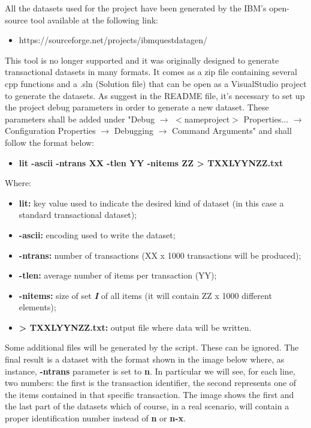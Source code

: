 \documentclass[]{report}
\begin{document}
	All the datasets used for the project have been generated by the IBM's open-source tool available at the following link:
	\begin{itemize}
		\item https://sourceforge.net/projects/ibmquestdatagen/
	\end{itemize}
	This tool is no longer supported and it was originally designed to generate transactional datasets in many formats. It comes as a zip file containing several cpp functions and a .sln (Solution file) that can be open as a VisualStudio project to generate the datasets. As suggest in the README file, it's necessary to set up the project debug parameters in order to generate a new dataset. These parameters shall be added under "Debug $\rightarrow$ $<$nameproject$>$ Properties... $\rightarrow$ Configuration Properties $\rightarrow$ Debugging $\rightarrow$ Command Arguments" and shall follow the format below:
	\begin{itemize}
		\item \textbf{lit -ascii -ntrans XX -tlen YY -nitems ZZ > TXXLYYNZZ.txt}
	\end{itemize}
	Where:
	\begin{itemize}	
		\item \textbf{lit:} key value used to indicate the desired kind of dataset (in this case a standard transactional dataset);
		\item \textbf{-ascii:} encoding used to write the dataset;
		\item \textbf{-ntrans:} number of transactions (XX x 1000 transactions will be produced);
		\item \textbf{-tlen:} average number of items per transaction (YY); 
		\item \textbf{-nitems:} size of set \textbf{\textit{I}} of all items (it will contain ZZ x 1000 different elements);
		\item \textbf{> TXXLYYNZZ.txt:} output file where data will be written.
	\end{itemize}
	Some additional files will be generated by the script. These can be ignored. The final result is a dataset with the format shown in the image below where, as instance, \textbf{-ntrans} parameter is set to \textbf{n}. 
	In particular we will see, for each line, two numbers: the first is the transaction identifier, the second represents one of the items contained in that specific transaction. The image shows the first and the last part of the datasets which of course, in a real scenario, will contain a proper identification number instead of \textbf{n} or \textbf{n-x}. 
\end{document}

